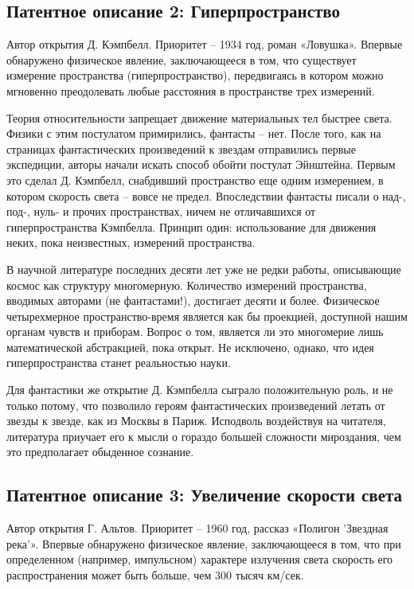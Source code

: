 \documentclass[11pt,a4paper]{article}
\begin{document}
\subsection*{Патентное описание 2: Гиперпространство}
Автор открытия Д. Кэмпбелл. Приоритет -- 1934 год, роман «Ловушка».  Впервые
обнаружено физическое явление, заключающееся в том, что существует измерение
пространства (гиперпространство), передвигаясь в котором можно мгновенно
преодолевать любые расстояния в пространстве трех измерений.

Теория относительности запрещает движение материальных тел быстрее света.
Физики с этим постулатом примирились, фантасты -- нет. После того, как на
страницах фантастических произведений к звездам отправились первые экспедиции,
авторы начали искать способ обойти постулат Эйнштейна. Первым это сделал
Д. Кэмпбелл, снабдивший пространство еще одним измерением, в котором скорость
света -- вовсе не предел. Впоследствии фантасты писали о над-, под-, нуль- и
прочих пространствах, ничем не отличавшихся от гиперпространства Кэмпбелла.
Принцип один: использование для движения неких, пока неизвестных, измерений
пространства.

В научной литературе последних десяти лет уже не редки работы, описывающие
космос как структуру многомерную. Количество измерений пространства, вводимых
авторами (не фантастами!), достигает десяти и более. Физическое четырехмерное
пространство-время является как бы проекцией, доступной нашим органам чувств и
приборам. Вопрос о том, является ли это многомерие лишь математической
абстракцией, пока открыт. Не исключено, однако, что идея гиперпространства
станет реальностью науки.

Для фантастики же открытие Д. Кэмпбелла сыграло положительную роль, и не
только потому, что позволило героям фантастических произведений летать от
звезды к звезде, как из Москвы в Париж. Исподволь воздействуя на читателя,
литература приучает его к мысли о гораздо большей сложности мироздания, чем
это предполагает обыденное сознание.

\subsection*{Патентное описание 3: Увеличение скорости света}
Автор открытия Г. Альтов. Приоритет -- 1960 год, рассказ «Полигон 'Звездная
река'».  Впервые обнаружено физическое явление, заключающееся в том, что при
определенном (например, импульсном) характере излучения света скорость его
распространения может быть больше, чем 300 тысяч км/сек.
\end{document}
